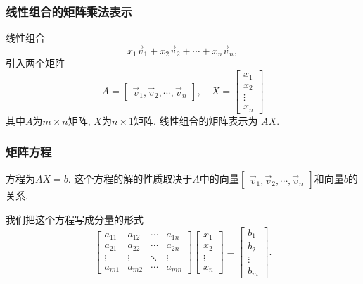 \subsubsection{线性组合的矩阵乘法表示}
线性组合
\begin{equation}
  x_1\vec{v}_1 + x_2 \vec{v}_2 + \cdots +x_n \vec{v}_n,
\end{equation}
引入两个矩阵
\begin{equation}
  A = \begin{bmatrix} \vec{v}_1, \vec{v}_2, \cdots, \vec{v}_n \end{bmatrix}, \quad 
  X = \begin{bmatrix} 
  x_1 \\ 
  x_2 \\ 
  \vdots \\ 
  x_n 
  \end{bmatrix}
\end{equation}
其中$A$为$m \times n$矩阵, $X$为$n \times 1$矩阵. 线性组合的矩阵表示为
$AX$.

\subsubsection{矩阵方程}
方程为$AX = b$. 这个方程的解的性质取决于$A$中的向量$\begin{bmatrix} \vec{v}_1, \vec{v}_2, \cdots, \vec{v}_n \end{bmatrix}$和向量$b$的关系.

我们把这个方程写成分量的形式
\begin{equation}
  \begin{bmatrix}
    a_{11}&a_{12}&\cdots&a_{1n}\\
    a_{21}&a_{22}&\cdots&a_{2n}\\
    \vdots&\vdots&\ddots&\vdots\\
    a_{m 1}&a_{m 2}&\cdots&a_{m n}
  \end{bmatrix}
  \begin{bmatrix} 
  x_1 \\ 
  x_2 \\ 
  \vdots \\ 
  x_n 
  \end{bmatrix}
  =
  \begin{bmatrix} 
  b_1 \\ 
  b_2 \\ 
  \vdots \\ 
  b_m
  \end{bmatrix}.
\end{equation}


